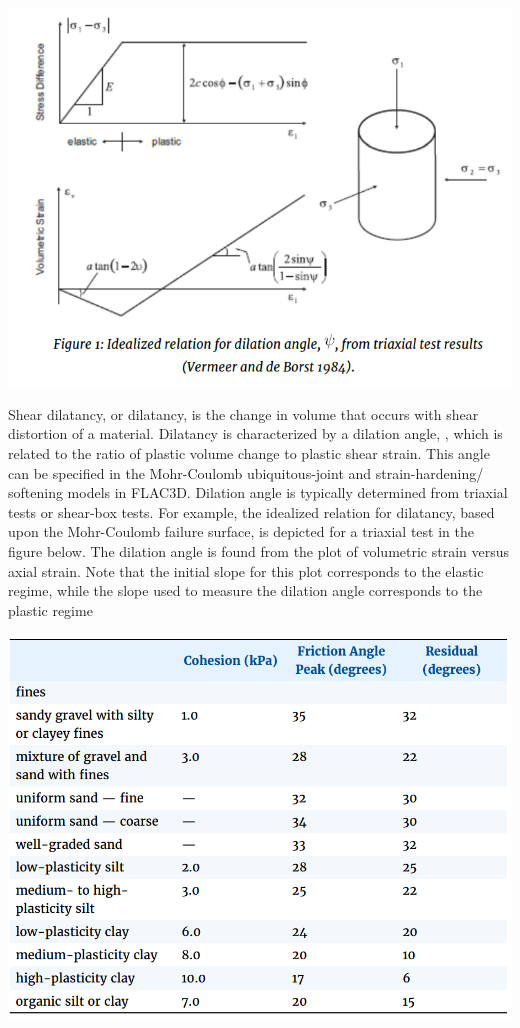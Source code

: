 \documentclass[a4paper, nobind]{templates/ociamthesis}
\begin{document}
\includegraphics[width=1\linewidth]{myfigureeeeee/dil}

Shear dilatancy, or dilatancy, is the change in volume that occurs with
shear distortion of a material. Dilatancy is characterized by a dilation
angle, , which is related to the ratio of plastic volume change to
plastic shear strain. This angle can be specified in the Mohr-Coulomb
ubiquitous-joint and strain-hardening/ softening models in FLAC3D.
Dilation angle is typically determined from triaxial tests or shear-box
tests. For example, the idealized relation for dilatancy, based upon the
Mohr-Coulomb failure surface, is depicted for a triaxial test in the
figure below. The dilation angle is found from the plot of volumetric
strain versus axial strain. Note that the initial slope for this plot
corresponds to the elastic regime, while the slope used to measure the
dilation angle corresponds to the plastic regime

\includegraphics[width=1\linewidth]{myfigureeeeee/typical_angles}
\end{document}
